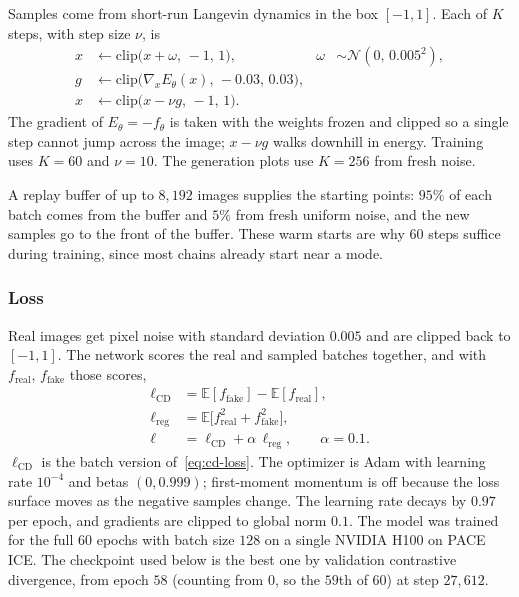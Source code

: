 Samples come from short-run Langevin dynamics in the box \([-1,1]\). Each of \(K\) steps, with step size \(\nu\), is
\begin{align}
  x &\leftarrow \mathrm{clip}\bigl(x + \omega,\, -1,\, 1\bigr),
  & \omega &\sim \mathcal{N}(0,\, 0.005^{2}), \nonumber \\
  g &\leftarrow \mathrm{clip}\bigl(\nabla_x E_\theta(x),\, -0.03,\, 0.03\bigr), \nonumber \\
  x &\leftarrow \mathrm{clip}\bigl(x - \nu g,\, -1,\, 1\bigr).
  \label{eq:langevin}
\end{align}
The gradient of \(E_\theta = -f_\theta\) is taken with the weights frozen and clipped so a single step cannot jump across the image; \(x - \nu g\) walks downhill in energy. Training uses \(K = 60\) and \(\nu = 10\). The generation plots use \(K = 256\) from fresh noise.

A replay buffer of up to \(8{,}192\) images supplies the starting points: \(95\%\) of each batch comes from the buffer and \(5\%\) from fresh uniform noise, and the new samples go to the front of the buffer. These warm starts are why \(60\) steps suffice during training, since most chains already start near a mode.

\subsubsection{Loss}

Real images get pixel noise with standard deviation \(0.005\) and are clipped back to \([-1,1]\). The network scores the real and sampled batches together, and with \(f_{\mathrm{real}}\), \(f_{\mathrm{fake}}\) those scores,
\begin{align}
  \ell_{\mathrm{CD}} &= \mathbb{E}[f_{\mathrm{fake}}] - \mathbb{E}[f_{\mathrm{real}}], \\
  \ell_{\mathrm{reg}} &= \mathbb{E}\bigl[f_{\mathrm{real}}^{2} + f_{\mathrm{fake}}^{2}\bigr], \\
  \ell &= \ell_{\mathrm{CD}} + \alpha\,\ell_{\mathrm{reg}},
  \qquad \alpha = 0.1.
  \label{eq:ebm-loss}
\end{align}
\(\ell_{\mathrm{CD}}\) is the batch version of~\eqref{eq:cd-loss}. The optimizer is Adam with learning rate \(10^{-4}\) and betas \((0, 0.999)\); first-moment momentum is off because the loss surface moves as the negative samples change. The learning rate decays by \(0.97\) per epoch, and gradients are clipped to global norm \(0.1\). The model was trained for the full \(60\) epochs with batch size \(128\) on a single NVIDIA H100 on PACE ICE. The checkpoint used below is the best one by validation contrastive divergence, from epoch \(58\) (counting from \(0\), so the \(59\)th of \(60\)) at step \(27{,}612\).

